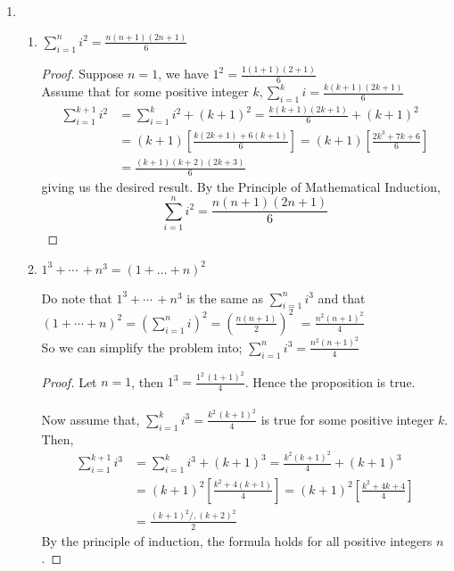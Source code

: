 \documentclass[11pt]{amsart}
\begin{document}
\begin{enumerate}[label=\arabic*.]
	\item 
		\begin{enumerate}[label=(\roman*)]
		\item $\sum_{i=1}^{n} i^2 = \frac{n(n+1)(2n+1)}{6}$\\
			\medskip
			\begin{proof}
				Suppose $n=1$, we have $1^2 = \frac{1(1+1)(2+1)}{6}$ \\
				Assume that for some positive integer $k, \sum_{i=1}^{k} i = \frac{k(k+1)(2k+1)}{6}$ \\
				\begin{align*}
					\sum_{i=1}^{k+1} i^2 &= \sum_{i=1}^{k} i^2 + (k+1)^2 = \frac{k(k+1)(2k+1)}{6} + (k+1)^2 \\
					&= (k+1)\left[\frac{k(2k+1)+6(k+1)}{6}\right] = (k+1)\left[\frac{2k^3 +7k + 6}{6}\right] \\
					&= \frac{(k+1)(k+2)(2k+3)}{6}
				\end{align*}
				giving us the desired result. By the Principle of Mathematical Induction,
				\[
					\sum_{i=1}^{n} i^2 = \frac{n(n+1)(2n+1)}{6}
				\]
			\end{proof}
		\item $1^3 + \cdots \, + n^3 = \left(1 + \dots + n\right)^2$ \\
			\medskip

			Do note that $1^3 + \cdots \, + n^3$ is the same as $\sum_{i=1}^n i^3$ and that\\
			$\left(1 + \cdots + n\right)^2 = \left(\sum_{i=1}^n i\right)^2 = \left(\frac{n(n+1)}{2}\right)^2$
			$= \frac{n^2(n+1)^2}{4}$ \\

			So we can simplify the problem into;
			$\sum_{i=1}^n i^3 = \frac{n^2(n+1)^2}{4}$ \\
			\begin{proof}
				Let $n=1$, then $1^3 = \frac{1^2 \, (1+1)^2}{4}$. Hence the proposition is true.\\
				\medskip\\
				Now assume that, $\sum_{i=1}^{k} i^3 = \frac{k^2\,(k+1)^2}{4}$ is true for some positive integer $k$.
				Then,\\
				\begin{align*}
					\sum_{i=1}^{k+1} i^3 &= \sum_{i=1}^{k} i^3 + (k+1)^3 = \frac{k^2 (k+1)^2}{4} + (k+1)^3 \\
							     &= (k+1)^2 \left[\frac{k^2 + 4(k+1)}{4}\right] = (k+1)^2\left[\frac{k^2 + 4k + 4}{4}\right]\\
					&= \frac{(k+1)^2/,(k+2)^2}{2}
				\end{align*}
       			By the principle of induction, the formula holds for all positive integers $n$.
			\end{proof}
	\end{enumerate}


\end{enumerate}
\end{document}
